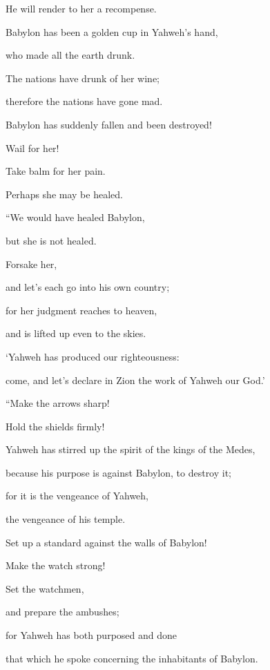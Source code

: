 {\par }{\QB He will render to her a recompense.
\par }{\Q {}Babylon has been a golden cup in Yahweh’s hand,
\par }{\QB who made all the earth drunk.
\par }{\Q The nations have drunk of her wine;
\par }{\QB therefore the nations have gone mad.
\par }{\Q {}Babylon has suddenly fallen and been destroyed!
\par }{\QB Wail for her!
\par }{\Q Take balm for her pain.
\par }{\QB Perhaps she may be healed.
\par }{\BB \par }{\Q {}“We would have healed Babylon,
\par }{\QB but she is not healed.
\par }{\Q Forsake her,
\par }{\QB and let’s each go into his own country;
\par }{\Q for her judgment reaches to heaven,
\par }{\QB and is lifted up even to the skies.
\par }{\Q {}‘Yahweh has produced our righteousness:
\par }{\QB come, and let’s declare in Zion the work of Yahweh our God.’
\par }{\BB \par }{\Q {}“Make the arrows sharp!
\par }{\QB Hold the shields firmly!
\par }{\Q Yahweh has stirred up the spirit of the kings of the Medes,
\par }{\QB because his purpose is against Babylon, to destroy it;
\par }{\Q for it is the vengeance of Yahweh,
\par }{\QB the vengeance of his temple.
\par }{\Q {}Set up a standard against the walls of Babylon!
\par }{\QB Make the watch strong!
\par }{\Q Set the watchmen,
\par }{\QB and prepare the ambushes;
\par }{\Q for Yahweh has both purposed and done
\par }{\QB that which he spoke concerning the inhabitants of Babylon.
}
